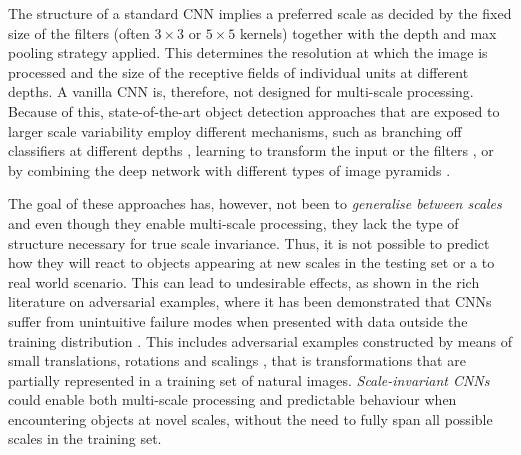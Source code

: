 \documentclass[twocolumn,runningheads]{svjour3}
\begin{document}
The structure of a standard CNN implies a preferred scale as decided by
the fixed size of the filters (often $3 \times 3$ or $5 \times 5$
kernels) together with the depth and max pooling strategy
applied. This determines the resolution at which the image is
processed and the size of the receptive fields of individual units at
different depths.
A vanilla CNN is, therefore, not designed for multi-scale
processing. Because of this, state-of-the-art object detection
approaches that are exposed to larger scale variability employ different mechanisms, such as
branching off classifiers at different depths
\cite{SerLeC11-IJCNN,CaiFanFerVas16-ECCV}, learning to transform the
input or the filters \cite{JadSimZisKav15-NIPS,LinLuc17-CVPR,HenVed17-ICML}, or
by combining the deep network with different types of image pyramids
\cite{SerEigZhaMatFerLeC13-arXiv,Gir15-ICCV,LinDolGirHeHarBel17-CVPR,LinGoyGirHeDol17-ICCV,HeKiDolGir17-ICCV,HuRam17-CVPR}. 

The goal of these approaches has, however, not been to {\em generalise between scales\/} 
and even though they enable multi-scale processing, they lack the type
of structure necessary for true scale invariance.
Thus, it is not possible to predict how they will react to objects
appearing at new scales in the testing set or a to real world
scenario. This can lead to undesirable effects, as shown in the rich
literature on adversarial examples, where it has been demonstrated
that CNNs suffer from unintuitive failure modes when presented with
data outside the training distribution
\cite{SzeZarSutBruErhGooFer13-arXiv,NguYoClu15-CVPR,MooFawFro16-CVPR,TanGri16-arXiv,SuVarKou17-arXiv,MooFawFawFro17-CVPR,BakLuErlKel18-CompBiol}.
This includes adversarial examples constructed by means of small
translations, rotations and scalings
\cite{EngTraTsiSchMad17-arXiv,FawFro15-BMVC}, that is transformations
that are partially represented in a training set of natural
images. {\em Scale-invariant CNNs\/} could enable both multi-scale
processing and predictable behaviour when encountering objects at
novel scales, without the need to fully span all possible scales in
the training set. 
\end{document}
